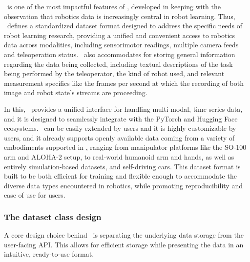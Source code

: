 \lerobotdataset~is one of the most impactful features of \lerobot, developed in keeping with the observation that robotics data is increasingly central in robot learning. 
Thus, \lerobot~defines a standardized dataset format designed to address the specific needs of robot learning research, providing a unified and convenient access to robotics data across modalities, including sensorimotor readings, multiple camera feeds and teleoperation status.
\lerobotdataset~also accommodates for storing general information regarding the data being collected, including textual descriptions of the task being performed by the teleoperator, the kind of robot used, and relevant measurement specifics like the frames per second at which the recording of both image and robot state's streams are proceeding.

In this, \lerobotdataset~provides a unified interface for handling multi-modal, time-series data, and it is designed to seamlessly integrate with the PyTorch and Hugging Face ecosystems.
\lerobotdataset~can be easily extended by users and it is highly customizable by users, and it already supports openly available data coming from a variety of embodiments supported in \lerobot, ranging from manipulator platforms like the SO-100 arm and ALOHA-2 setup, to real-world humanoid arm and hands, as well as entirely simulation-based datasets, and self-driving cars.
This dataset format is built to be both efficient for training and flexible enough to accommodate the diverse data types encountered in robotics, while promoting reproducibility and ease of use for users. 

\subsubsection{The dataset class design}

A core design choice behind \lerobotdataset~is separating the underlying data storage from the user-facing API.
This allows for efficient storage while presenting the data in an intuitive, ready-to-use format.

